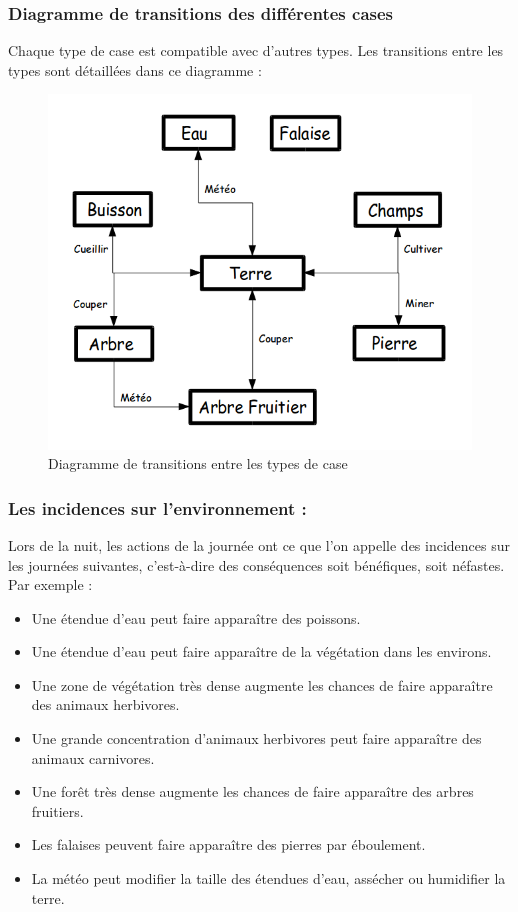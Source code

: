 \documentclass[a4paper]{memoir}
\begin{document}
				\subsubsection{Diagramme de transitions des différentes cases}
					Chaque type de case est compatible avec d'autres types. Les transitions entre les types sont détaillées dans ce diagramme :
					\begin{figure}[H]
						\begin{center}
							\includegraphics[scale=0.5]{img/DiagrammeTransitionCases.png} 
						\end{center}
						\label{fig:case}
						\caption{Diagramme de transitions entre les types de case}
					\end{figure}
			
				\subsubsection{Les incidences sur l'environnement :}
					Lors de la nuit, les actions de la journée ont ce que l'on appelle des incidences sur les journées suivantes, c'est-à-dire des conséquences soit bénéfiques, soit néfastes. Par exemple :
					\begin{itemize}[label=$\bullet$]
						\item Une étendue d'eau peut faire apparaître des poissons.
						\item Une étendue d'eau peut faire apparaître de la végétation dans les environs.
						\item Une zone de végétation très dense augmente les chances de faire apparaître des animaux herbivores.
						\item Une grande concentration d'animaux herbivores peut faire apparaître des animaux carnivores.
						\item Une forêt très dense augmente les chances de faire apparaître des arbres fruitiers.
						\item Les falaises peuvent faire apparaître des pierres par éboulement.
						\item La météo peut modifier la taille des étendues d'eau, assécher ou humidifier la terre.
					\end{itemize}
				
\end{document}
